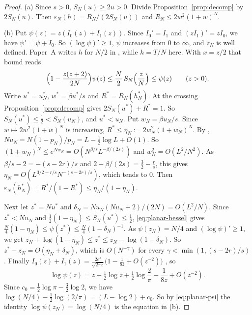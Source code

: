 \begin{proof}
(a) Since $s>0$, $S_N(u)\ge2u>0$. Divide Proposition~\ref{prop:decomp} by $2S_N(u)$. Then
$\varepsilon_N(h)=R_N/(2S_N(u))$ and $R_N\le2w^2(1+w)^N$.

(b) Put $\psi(z)=z(I_0(z)+I_1(z))$. Since $I_0'=I_1$ and $(zI_1)'=zI_0$, we have $\psi'=\psi+I_0$.
So $(\log\psi)'\ge1$, $\psi$ increases from $0$ to $\infty$, and $z_N$ is well defined. Paper~A
writes $h$ for $N/2$ in \cite[Eq.~(6)]{paperA}, while $h=T/N$ here. With $x=z/2$ that bound reads
\begin{equation}\label{eq:planar-bessel}
 \Bigl(1-\frac{z(z+2)}{2N}\Bigr)\psi(z)\le\frac N2\,S_N\Bigl(\frac zN\Bigr)\le\psi(z)
 \qquad(z>0).
\end{equation}
Write $u^*=u^*_N$, $w^*=\beta u^*/s$ and $R^*=R_N(h^*_N)$. At the crossing
Proposition~\ref{prop:decomp} gives $2S_N(u^*)+R^*=1$. So $S_N(u^*)\le\frac12<S_N(u_N)$, and
$u^*<u_N$. Put $w_N=\beta u_N/s$. Since $w\mapsto2w^2(1+w)^N$ is increasing,
$R^*\le\eta_N:=2w_N^2(1+w_N)^N$. By \cite[Eq.~(7)]{paperA}, $Nu_N=N(1-p_N)/p_N=L-\frac12\log L+O(1)$.
So $(1+w_N)^N\le e^{Nw_N}=O(N^{\beta/s}L^{-\beta/(2s)})$ and $w_N^2=O(L^2/N^2)$. As
$\beta/s-2=-(s-2r)/s$ and $2-\beta/(2s)=\frac32-\frac rs$, this gives
$\eta_N=O(L^{3/2-r/s}N^{-(s-2r)/s})$, which tends to $0$. Then
$\varepsilon_N(h^*_N)=R^*/(1-R^*)\le\eta_N/(1-\eta_N)$.

Next let $z^*=Nu^*$ and $\delta_N=Nu_N(Nu_N+2)/(2N)=O(L^2/N)$. Since $z^*<Nu_N$ and
$\frac12(1-\eta_N)\le S_N(u^*)\le\frac12$, \eqref{eq:planar-bessel} gives
$\frac N4(1-\eta_N)\le\psi(z^*)\le\frac N4(1-\delta_N)^{-1}$. As $\psi(z_N)=N/4$ and
$(\log\psi)'\ge1$, we get $z_N+\log(1-\eta_N)\le z^*\le z_N-\log(1-\delta_N)$. So
$z^*-z_N=O(\eta_N+\delta_N)$, which is $O(N^{-\gamma})$ for every $\gamma<\min(1,(s-2r)/s)$. Finally
$I_0(z)+I_1(z)=\frac{2e^z}{\sqrt{2\pi z}}\bigl(1-\frac1{8z}+O(z^{-2})\bigr)$
\cite[Eq.~10.40.1]{dlmf}, so
\begin{equation}\label{eq:planar-psi}
 \log\psi(z)=z+\tfrac12\log z+\tfrac12\log\frac2\pi-\frac1{8z}+O(z^{-2}).
\end{equation}
Since $c_0=\frac12\log\pi-\frac32\log2$, we have $\log(N/4)-\frac12\log(2/\pi)=(L-\log2)+c_0$. So by
\eqref{eq:planar-psi} the identity $\log\psi(z_N)=\log(N/4)$ is the equation in (b).


\end{proof}
